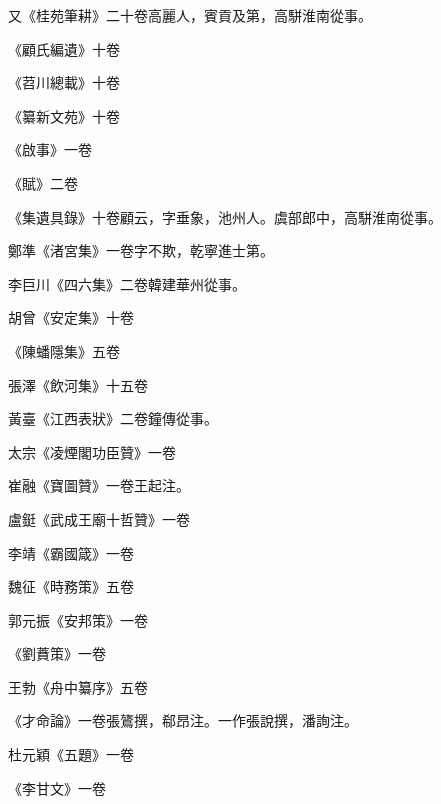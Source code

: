\begin{pinyinscope}
 又《桂苑筆耕》二十卷高麗人，賓貢及第，高駢淮南從事。



 《顧氏編遺》十卷



 《苕川總載》十卷



 《纂新文苑》十卷



 《啟事》一卷



 《賦》二卷



 《集遺具錄》十卷顧云，字垂象，池州人。虞部郎中，高駢淮南從事。



 鄭準《渚宮集》一卷字不欺，乾寧進士第。



 李巨川《四六集》二卷韓建華州從事。



 胡曾《安定集》十卷



 《陳蟠隱集》五卷



 張澤《飲河集》十五卷



 黃臺《江西表狀》二卷鐘傳從事。



 太宗《凌煙閣功臣贊》一卷



 崔融《寶圖贊》一卷王起注。



 盧鋌《武成王廟十哲贊》一卷



 李靖《霸國箴》一卷



 魏征《時務策》五卷



 郭元振《安邦策》一卷



 《劉蕡策》一卷



 王勃《舟中纂序》五卷



 《才命論》一卷張鷟撰，郗昂注。一作張說撰，潘詢注。



 杜元穎《五題》一卷



 《李甘文》一卷




\end{pinyinscope}
